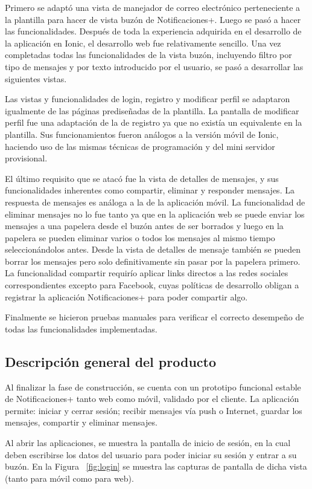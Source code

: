 Primero se adaptó una vista de manejador de correo electrónico perteneciente a la plantilla para hacer de vista buzón de Notificaciones+. Luego se pasó a hacer las funcionalidades. Después de toda la experiencia adquirida en el desarrollo de la aplicación en Ionic, el desarrollo web fue relativamente sencillo. Una vez completadas todas las funcionalidades de la vista buzón, incluyendo filtro por tipo de mensajes y por texto introducido por el usuario, se pasó a desarrollar las siguientes vistas.


Las vistas y funcionalidades de login, registro y modificar perfil se adaptaron igualmente de las páginas prediseñadas de la plantilla. La pantalla de modificar perfil fue una adaptación de la de registro ya que no existía un equivalente en la plantilla. Sus funcionamientos fueron análogos a la versión móvil de Ionic, haciendo uso de las mismas técnicas de programación y del mini servidor provisional.


El último requisito que se atacó fue la vista de detalles de mensajes, y sus funcionalidades inherentes como compartir, eliminar y responder mensajes. La respuesta de mensajes es análoga a la de la aplicación móvil. La funcionalidad de eliminar mensajes no lo fue tanto ya que en la aplicación web se puede enviar los mensajes a una papelera desde el buzón antes de ser borrados y luego en la papelera se pueden eliminar varios o todos los mensajes al mismo tiempo seleccionándolos antes. Desde la vista de detalles de mensaje también se pueden borrar los mensajes pero solo definitivamente sin pasar por la papelera primero. La funcionalidad compartir requirío aplicar links directos a las redes sociales correspondientes excepto para Facebook, cuyas políticas de desarrollo obligan a registrar la aplicación Notificaciones+ para poder compartir algo.


Finalmente se hicieron pruebas manuales para verificar el correcto desempeño de todas las funcionalidades implementadas. 


\subsection{Descripción general del producto}
Al finalizar la fase de construcción, se cuenta con un prototipo funcional estable de Notificaciones+ tanto web como móvil, validado por el cliente. La aplicación permite: iniciar y cerrar sesión; recibir mensajes vía push o Internet, guardar los mensajes, compartir y eliminar mensajes.

Al abrir las aplicaciones, se muestra la pantalla de inicio de sesión, en la cual deben escribirse los datos del usuario para poder iniciar su sesión y entrar a su buzón. En la Figura ~\ref{fig:login} se muestra las capturas de pantalla de dicha vista (tanto para móvil como para web).

